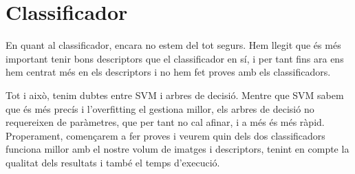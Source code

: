 
\section{Classificador}%
\label{sec:classificador}

En quant al classificador, encara no estem del tot segurs. Hem llegit que és més
important tenir bons descriptors que el classificador en sí, i per tant fins
ara ens hem centrat més en els descriptors i no hem fet proves amb els
classificadors.

Tot i això, tenim dubtes entre SVM i arbres de decisió. Mentre que SVM sabem que és més precís i l'overfitting el gestiona millor, els arbres de decisió no
requereixen de paràmetres, que per tant no cal afinar, i a més és més ràpid.
Properament, començarem a fer proves i veurem quin dels dos classificadors
funciona millor amb el nostre volum de imatges i descriptors, tenint en compte
la qualitat dels resultats i també el temps d'execució.
